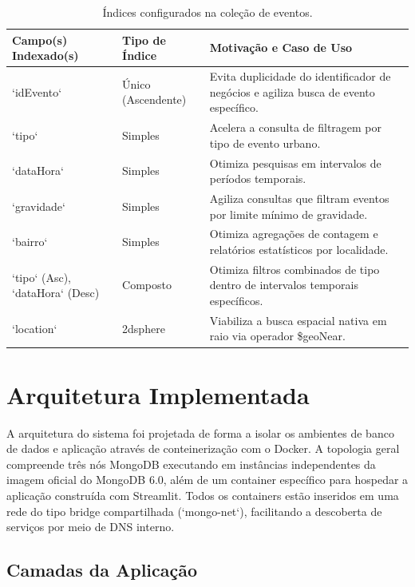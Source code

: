 \documentclass[12pt]{article}
\begin{document}
\begin{table}[ht]
\centering
\caption{Índices configurados na coleção de eventos.}
\label{tab:indices}
\small
\begin{tabular}{lp{3.5cm}p{6cm}}
\toprule
\textbf{Campo(s) Indexado(s)} & \textbf{Tipo de Índice} & \textbf{Motivação e Caso de Uso} \\
\midrule
`idEvento` & Único (Ascendente) & Evita duplicidade do identificador de negócios e agiliza busca de evento específico. \\
`tipo` & Simples & Acelera a consulta de filtragem por tipo de evento urbano. \\
`dataHora` & Simples & Otimiza pesquisas em intervalos de períodos temporais. \\
`gravidade` & Simples & Agiliza consultas que filtram eventos por limite mínimo de gravidade. \\
`bairro` & Simples & Otimiza agregações de contagem e relatórios estatísticos por localidade. \\
`tipo` (Asc), `dataHora` (Desc) & Composto & Otimiza filtros combinados de tipo dentro de intervalos temporais específicos. \\
`location` & 2dsphere & Viabiliza a busca espacial nativa em raio via operador \$geoNear. \\
\bottomrule
\end{tabular}
\end{table}

\section{Arquitetura Implementada}
\label{sec:arquitetura}

A arquitetura do sistema foi projetada de forma a isolar os ambientes de banco de dados e aplicação através de conteinerização com o Docker. A topologia geral compreende três nós MongoDB executando em instâncias independentes da imagem oficial do MongoDB 6.0, além de um container específico para hospedar a aplicação construída com Streamlit. Todos os containers estão inseridos em uma rede do tipo bridge compartilhada (`mongo-net`), facilitando a descoberta de serviços por meio de DNS interno.

\subsection{Camadas da Aplicação}
\end{document}
